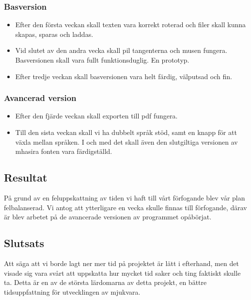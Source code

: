 \documentclass[a4paper,11p,twoside]{article}
\begin{document}
\subsubsection{Basversion}
\begin{itemize}
	\item Efter den första veckan skall texten vara korrekt roterad och filer skall kunna skapas, sparas och laddas.
	\item Vid slutet av den andra vecka skall pil tangenterna och musen fungera. Basversionen skall vara fullt funktionsduglig. En prototyp.
	\item Efter tredje veckan skall basversionen vara helt färdig, välputsad och fin.
\end{itemize}

\subsubsection{Avancerad version}
\begin{itemize}
	\item Efter den fjärde veckan skall exporten till pdf fungera.
	\item Till den sista veckan skall vi ha dubbelt språk stöd, samt en knapp för att växla mellan språken. I och med det skall även den slutgiltiga versionen av mhasira fonten vara färdigställd.
\end{itemize}

\subsection{Resultat}
På grund av en feluppskattning av tiden vi haft till vårt förfogande blev vår plan felbalanserad. Vi antog att ytterligare en vecka skulle finnas till förfogande, därav är blev arbetet på de avancerade versionen av programmet opåbörjat.

\subsection{Slutsats}
Att säga att vi borde lagt ner mer tid på projektet är lätt i efterhand, men det visade sig vara svårt att uppskatta hur mycket tid saker och ting faktiskt skulle ta. Detta är en av de största lärdomarna av detta projekt, en bättre tidsuppfattning för utvecklingen av mjukvara.
\end{document}
